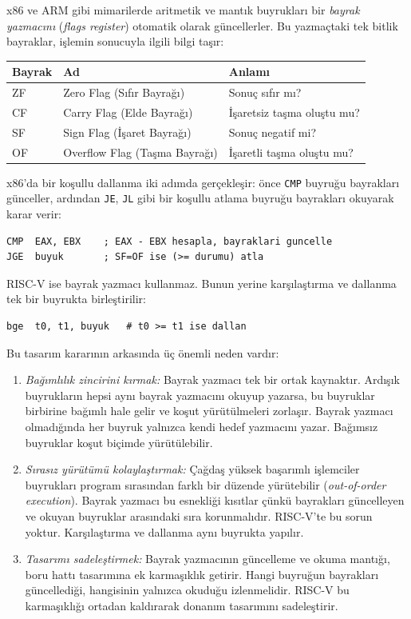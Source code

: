 x86 ve ARM gibi mimarilerde aritmetik ve mantık buyrukları bir \emph{bayrak yazmacını} (\emph{flags register}) otomatik olarak güncellerler. Bu yazmaçtaki tek bitlik bayraklar, işlemin sonucuyla ilgili bilgi taşır:

\begin{center}
\small
\begin{tabular}{lll}
\toprule
Bayrak & Ad & Anlamı \\
\midrule
ZF & Zero Flag (Sıfır Bayrağı) & Sonuç sıfır mı? \\
CF & Carry Flag (Elde Bayrağı) & İşaretsiz taşma oluştu mu? \\
SF & Sign Flag (İşaret Bayrağı) & Sonuç negatif mi? \\
OF & Overflow Flag (Taşma Bayrağı) & İşaretli taşma oluştu mu? \\
\bottomrule
\end{tabular}
\end{center}

x86'da bir koşullu dallanma iki adımda gerçekleşir: önce \texttt{CMP} buyruğu bayrakları günceller, ardından \texttt{JE}, \texttt{JL} gibi bir koşullu atlama buyruğu bayrakları okuyarak karar verir:

\begin{lstlisting}[language={[x86masm]Assembler}, style=alistirma-kod]
CMP  EAX, EBX    ; EAX - EBX hesapla, bayraklari guncelle
JGE  buyuk       ; SF=OF ise (>= durumu) atla
\end{lstlisting}

RISC-V ise bayrak yazmacı kullanmaz. Bunun yerine karşılaştırma ve dallanma tek bir buyrukta birleştirilir:

\begin{lstlisting}[style=riscv]
bge  t0, t1, buyuk   # t0 >= t1 ise dallan
\end{lstlisting}

Bu tasarım kararının arkasında üç önemli neden vardır:

\begin{enumerate}
\item \emph{Bağımlılık zincirini kırmak:} Bayrak yazmacı tek bir ortak kaynaktır. Ardışık buyrukların hepsi aynı bayrak yazmacını okuyup yazarsa, bu buyruklar birbirine bağımlı hale gelir ve koşut yürütülmeleri zorlaşır. Bayrak yazmacı olmadığında her buyruk yalnızca kendi hedef yazmacını yazar. Bağımsız buyruklar koşut biçimde yürütülebilir.

\item \emph{Sırasız yürütümü kolaylaştırmak:} Çağdaş yüksek başarımlı işlemciler buyrukları program sırasından farklı bir düzende yürütebilir (\emph{out-of-order execution}). Bayrak yazmacı bu esnekliği kısıtlar çünkü bayrakları güncelleyen ve okuyan buyruklar arasındaki sıra korunmalıdır. RISC-V'te bu sorun yoktur. Karşılaştırma ve dallanma aynı buyrukta yapılır.

\item \emph{Tasarımı sadeleştirmek:} Bayrak yazmacının güncelleme ve okuma mantığı, boru hattı tasarımına ek karmaşıklık getirir. Hangi buyruğun bayrakları güncellediği, hangisinin yalnızca okuduğu izlenmelidir. RISC-V bu karmaşıklığı ortadan kaldırarak donanım tasarımını sadeleştirir.
\end{enumerate}

